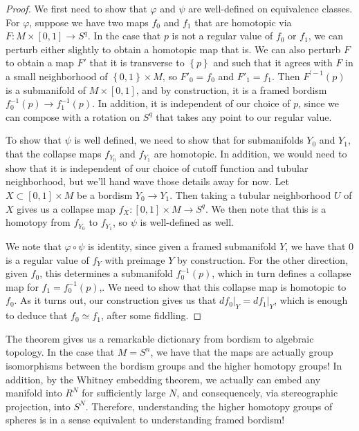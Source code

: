 \documentclass[psamsfonts]{amsart}
\theoremstyle{definition}
\theoremstyle{remark}
\newcommand{\inv}{^{-1}}
\newcommand{\set}[1]{\left\lbrace #1 \right\rbrace}
\begin{document}
\begin{proof}
We first need to show that $\varphi$ and $\psi$ are well-defined on equivalence classes. For $\varphi$, suppose we have two maps $f_0$ and $f_1$ that are homotopic via $F : M \times [0,1] \to S^q$. In the case that $p$ is not a regular value of $f_0$ or $f_1$, we can perturb either slightly to obtain a homotopic map that is. We can also perturb $F$ to obtain a map $F'$ that it is transverse to $\set{p}$ and such that it agrees with $F$ in a small neighborhood of $\set{0,1} \times M$, so $F'_0 = f_0$ and $F'_1 = f_1$. Then $F^{'-1}(p)$ is a submanifold of $M \times [0,1]$, and by construction, it is a framed bordism $f_0\inv(p) \to f_1\inv(p)$. In addition, it is independent of our choice of $p$, since we can compose with a rotation on $S^q$ that takes any point to our regular value.

To show that $\psi$ is well defined, we need to show that for submanifolds $Y_0$ and $Y_1$, that the collapse maps $f_{Y_0}$ and $f_{Y_1}$ are homotopic. In addition, we would need to show that it is independent of our choice of cutoff function and tubular neighborhood, but we'll hand wave those details away for now. Let $X \subset [0,1] \times M$ be a bordism $Y_0 \to Y_1$. Then taking a tubular neighborhood $U$ of $X$ gives us a collapse map $f_X : [0,1] \times M \to S^q$. We then note that this is a homotopy from $f_{Y_0}$ to $f_{Y_1}$, so $\psi$ is well-defined as well.

We note that $\varphi \circ \psi$ is identity, since given a framed submanifold $Y$, we have that $0$ is a regular value of $f_Y$ with preimage $Y$ by construction. For the other direction, given $f_0$, this determines a submanifold $f_0\inv(p)$, which in turn defines a collapse map for $f_1 = f_0\inv(p)$,. We need to show that this collapse map is homotopic to $f_0$. As it turns out, our construction gives us that $df_0\vert_Y = df_1\vert_Y$, which is enough to deduce that $f_0 \simeq f_1$, after some fiddling.
\end{proof}
The theorem gives us a remarkable dictionary from bordism to algebraic topology. In the case that $M = S^n$, we have that the maps are actually group isomorphisms between the bordism groups and the higher homotopy groups! In addition, by the Whitney embedding theorem, we actually can embed any manifold into $R^N$ for sufficiently large $N$, and consequencely, via stereographic projection, into $S^N$. Therefore, understanding the higher homotopy groups of spheres is in a sense equivalent to understanding framed bordism!
%
\end{document}
